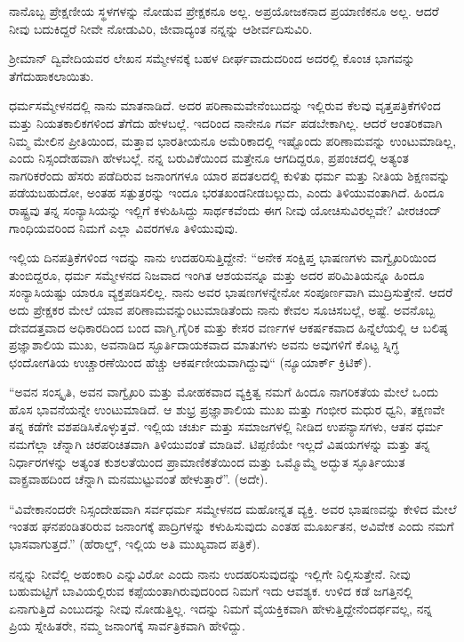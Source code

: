 ನಾನೊಬ್ಬ ಪ್ರೇಕ್ಷಣೀಯ ಸ್ಥಳಗಳನ್ನು ನೋಡುವ ಪ್ರೇಕ್ಷಕನೂ ಅಲ್ಲ. ಅಪ್ರಯೋಜಕನಾದ ಪ್ರಯಾಣಿಕನೂ ಅಲ್ಲ. ಆದರೆ ನೀವು ಬದುಕಿದ್ದರೆ ನೀವೇ ನೋಡುವಿರಿ, ಜೀವಾದ್ಯಂತ ನನ್ನನ್ನು ಆಶೀರ್ವದಿಸುವಿರಿ.

ಶ‍್ರೀಮಾನ್ ದ್ವಿವೇದಿಯವರ ಲೇಖನ ಸಮ್ಮೇಳನಕ್ಕೆ ಬಹಳ ದೀರ್ಘವಾದುದರಿಂದ ಅದರಲ್ಲಿ ಕೊಂಚ ಭಾಗವನ್ನು ತೆಗೆದುಹಾಕಲಾಯಿತು.

ಧರ್ಮಸಮ್ಮೇಳನದಲ್ಲಿ ನಾನು ಮಾತನಾಡಿದೆ. ಅದರ ಪರಿಣಾಮವೇನೆಂಬುದನ್ನು ಇಲ್ಲಿರುವ ಕೆಲವು ವೃತ್ತಪತ್ರಿಕೆಗಳಿಂದ ಮತ್ತು ನಿಯತಕಾಲಿಕಗಳಿಂದ ತೆಗೆದು ಹೇಳಬಲ್ಲೆ. ಇದರಿಂದ ನಾನೇನೂ ಗರ್ವ ಪಡಬೇಕಾಗಿಲ್ಲ. ಆದರೆ ಆಂತರಿಕವಾಗಿ ನಿಮ್ಮ ಮೇಲಿನ ಪ್ರೀತಿಯಿಂದ, ಮತ್ತಾವ ಭಾರತೀಯನೂ ಅಮೆರಿಕಾದಲ್ಲಿ ಇಷ್ಟೊಂದು ಪರಿಣಾಮವನ್ನು ಉಂಟುಮಾಡಿಲ್ಲ, ಎಂದು ನಿಸ್ಸಂದೇಹವಾಗಿ ಹೇಳಬಲ್ಲೆ. ನನ್ನ ಬರುವಿಕೆಯಿಂದ ಮತ್ತೇನೂ ಆಗದಿದ್ದರೂ, ಪ್ರಪಂಚದಲ್ಲಿ ಅತ್ಯಂತ ನಾಗರಿಕರೆಂದು ಹೆಸರು ಪಡೆದಿರುವ ಜನಾಂಗಗಳೂ ಯಾರ ಪದತಲದಲ್ಲಿ ಕುಳಿತು ಧರ್ಮ ಮತ್ತು ನೀತಿಯ ಶಿಕ್ಷಣವನ್ನು ಪಡೆಯಬಹುದೋ, ಅಂತಹ ಸತ್ಪುತ್ರರನ್ನು ಇಂದೂ ಭರತಖಂಡನೀಡಬಲ್ಲುದು, ಎಂದು ತಿಳಿಯುವಂತಾಗಿದೆ. ಹಿಂದೂ ರಾಷ್ಟ್ರವು ತನ್ನ ಸಂನ್ಯಾಸಿಯನ್ನು ಇಲ್ಲಿಗೆ ಕಳುಹಿಸಿದ್ದು ಸಾರ್ಥಕವೆಂದು ಈಗ ನೀವು ಯೋಚಿಸುವಿರಲ್ಲವೇ? ವೀರಚಂದ್ ಗಾಂಧಿಯವರಿಂದ ನಿಮಗೆ ಎಲ್ಲಾ ವಿವರಗಳೂ ತಿಳಿಯುವುವು.

ಇಲ್ಲಿಯ ದಿನಪತ್ರಿಕೆಗಳಿಂದ ಇದನ್ನು ನಾನು ಉದಹರಿಸುತ್ತಿದ್ದೇನೆ: “ಅನೇಕ ಸಂಕ್ಷಿಪ್ತ ಭಾಷಣಗಳು ವಾಗ್ವೈಖರಿಯಿಂದ ತುಂಬಿದ್ದರೂ, ಧರ್ಮ ಸಮ್ಮೇಳನದ ನಿಜವಾದ ಇಂಗಿತ ಆಶಯವನ್ನೂ ಮತ್ತು ಅದರ ಪರಿಮಿತಿಯನ್ನೂ ಹಿಂದೂ ಸಂನ್ಯಾಸಿಯಷ್ಟು ಯಾರೂ ವ್ಯಕ್ತಪಡಿಸಲಿಲ್ಲ. ನಾನು ಅವರ ಭಾಷಣಗಳನ್ನೇನೋ ಸಂಪೂರ್ಣವಾಗಿ ಮುದ್ರಿಸುತ್ತೇನೆ. ಆದರೆ ಅದು ಪ್ರೇಕ್ಷಕರ ಮೇಲೆ ಯಾವ ಪರಿಣಾಮವನ್ನುಂಟುಮಾಡಿತೆಂದು ನಾನು ಕೇವಲ ಸೂಚಿಸಬಲ್ಲೆ, ಅಷ್ಟೆ. ಅವನೊಬ್ಬ ದೇವದತ್ತವಾದ ಅಧಿಕಾರದಿಂದ ಬಂದ ವಾಗ್ಮಿ.ಗೈರಿಕ ಮತ್ತು ಕೇಸರ ವರ್ಣಗಳ ಆಕರ್ಷಕವಾದ ಹಿನ್ನೆಲೆಯಲ್ಲಿ ಆ ಬಲಿಷ್ಠ ಪ್ರಜ್ಞಾಶಾಲಿಯ ಮುಖ, ಅವನಾಡಿದ ಸ್ಫೂರ್ತಿದಾಯಕವಾದ ಮಾತುಗಳು ಅವನು ಅವುಗಳಿಗೆ ಕೊಟ್ಟ ಸ್ನಿಗ್ಧ ಛಂದೋಗತಿಯ ಉಚ್ಚಾರಣೆಯಿಂದ ಹೆಚ್ಚು ಆಕರ್ಷಣೀಯವಾಗಿದ್ದುವು“ (ನ್ಯೂಯಾರ್ಕ್ ಕ್ರಿಟಿಕ್).

“ಅವನ ಸಂಸ್ಕೃತಿ, ಅವನ ವಾಗ್ವೈಖರಿ ಮತ್ತು ಮೋಹಕವಾದ ವ್ಯಕ್ತಿತ್ವ ನಮಗೆ ಹಿಂದೂ ನಾಗರಿಕತೆಯ ಮೇಲೆ ಒಂದು ಹೊಸ ಭಾವನೆಯನ್ನೇ ಉಂಟುಮಾಡಿದೆ. ಆ ಶುಭ್ರ ಪ್ರಜ್ಞಾಶಾಲಿಯ ಮುಖ ಮತ್ತು ಗಂಭೀರ ಮಧುರ ಧ್ವನಿ, ತಕ್ಷಣವೇ ತನ್ನ ಕಡೆಗೇ ವಶಪಡಿಸಿಕೊಳ್ಳುತ್ತವೆ. ಇಲ್ಲಿಯ ಚರ್ಚು ಮತ್ತು ಸಮಾಜಗಳಲ್ಲಿ ನೀಡಿದ ಉಪನ್ಯಾಸಗಳು, ಆತನ ಧರ್ಮ ನಮಗೆಲ್ಲಾ ಚೆನ್ನಾಗಿ ಚಿರಪರಿಚಿತವಾಗಿ ತಿಳಿಯುವಂತೆ ಮಾಡಿವೆ. ಟಿಪ್ಪಣಿಯೇ ಇಲ್ಲದೆ ವಿಷಯಗಳನ್ನು ಮತ್ತು ತನ್ನ ನಿರ್ಧಾರಗಳನ್ನು ಅತ್ಯಂತ ಕುಶಲತೆಯಿಂದ ಪ್ರಾಮಾಣಿಕತೆಯಿಂದ ಮತ್ತು ಒಮ್ಮೊಮ್ಮೆ ಅದ್ಭುತ ಸ್ಫೂರ್ತಿಯುತ ವಾಕ್ಪ್ರವಾಹದಿಂದ ಚೆನ್ನಾಗಿ ಮನಮುಟ್ಟುವಂತೆ ಹೇಳುತ್ತಾರೆ”. (ಅದೇ).

“ವಿವೇಕಾನಂದರೇ ನಿಸ್ಸಂದೇಹವಾಗಿ ಸರ್ವಧರ್ಮ ಸಮ್ಮೇಳನದ ಮಹೋನ್ನತ ವ್ಯಕ್ತಿ. ಅವರ ಭಾಷಣವನ್ನು ಕೇಳಿದ ಮೇಲೆ ಇಂತಹ ಘನಪಂಡಿತರಿರುವ ಜನಾಂಗಕ್ಕೆ ಪಾದ್ರಿಗಳನ್ನು ಕಳುಹಿಸುವುದು ಎಂತಹ ಮೂರ್ಖತನ, ಅವಿವೇಕ ಎಂದು ನಮಗೆ ಭಾಸವಾಗುತ್ತದೆ.” (ಹೆರಾಲ್ಡ್, ಇಲ್ಲಿಯ ಅತಿ ಮುಖ್ಯವಾದ ಪತ್ರಿಕೆ).

ನನ್ನನ್ನು ನೀವೆಲ್ಲಿ ಅಹಂಕಾರಿ ಎನ್ನುವಿರೋ ಎಂದು ನಾನು ಉದಹರಿಸುವುದನ್ನು ಇಲ್ಲಿಗೇ ನಿಲ್ಲಿಸುತ್ತೇನೆ. ನೀವು ಬಹುಮಟ್ಟಿಗೆ ಬಾವಿಯಲ್ಲಿರುವ ಕಪ್ಪೆಯಂತಾಗಿರುವುದರಿಂದ ನಿಮಗೆ ಇದು ಆವಶ್ಯಕ. ಉಳಿದ ಕಡೆ ಜಗತ್ತಿನಲ್ಲಿ ಏನಾಗುತ್ತಿದೆ ಎಂಬುದನ್ನು ನೀವು ನೋಡುತ್ತಿಲ್ಲ. ಇದನ್ನು ನಿಮಗೆ ವೈಯಕ್ತಿಕವಾಗಿ ಹೇಳುತ್ತಿದ್ದೇನೆಂದರ್ಥವಲ್ಲ, ನನ್ನ ಪ್ರಿಯ ಸ್ನೇಹಿತರೇ, ನಮ್ಮ ಜನಾಂಗಕ್ಕೆ ಸಾರ್ವತ್ರಿಕವಾಗಿ ಹೇಳಿದ್ದು.

